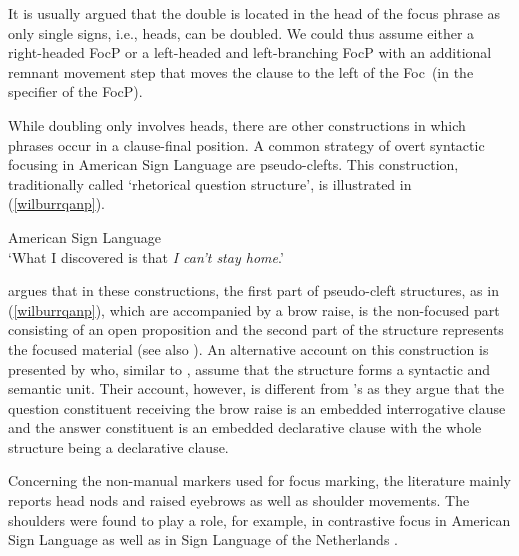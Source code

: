 It is usually argued that the double is located in the head of the focus phrase as only single signs, i.e., heads, can be doubled. We could thus assume either a right-headed FocP or a left-headed and left-branching FocP with an additional remnant movement step that moves the clause to the left of the Foc\textdegree\ (in the specifier of the FocP).  

While doubling only involves heads, there are other constructions in which phrases occur in a clause-final position. \label{pseudocleeeeefts}A common strategy of overt syntactic focusing in American Sign Language are pseudo-clefts. This construction, traditionally called `rhetorical question structure', is illustrated in (\ref{wilburrqanp}).

\begin{exe}
\ex American Sign Language \citep[92]{wilbur1997prosodic} \\  
\glt `What I discovered is that \textit{I can't stay home}.' \label{wilburrqanp}
\end{exe}

\noindent \citet{wilbur1997prosodic} argues that in these constructions, the first part of pseudo-cleft structures, as in (\ref{wilburrqanp}), which are accompanied by a brow raise, is the non-focused part consisting of an open proposition and the second part of the structure represents the focused material (see also \citealt{wilbur1994foregrounding, wilbur1996evidence}). An alternative account on this construction is presented by \citet{caponigro2011ask} who, similar to \citet{wilbur1996evidence}, assume that the structure forms a syntactic and semantic unit. Their account, however, is different from \citeauthor{wilbur1996evidence}'s as they argue that the question constituent receiving the brow raise is an embedded interrogative clause and the answer constituent is an embedded declarative clause with the whole structure being a declarative clause. 

Concerning the non-manual markers used for focus marking, the literature mainly reports head nods and raised eyebrows  as well as shoulder movements. The shoulders were found to play a role, for example, in contrastive focus in American Sign Language \citep{wilbur1999syntactic} as well as in Sign Language of the Netherlands \citep{crasborn2013phonology}.

